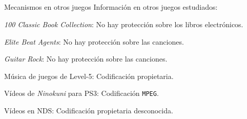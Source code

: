 \subsection{}
\begin{frame}{Mecanismos en otros juegos}
Información en otros juegos estudiados:

\begin{wideitemize}
    \item<+-> \textit{100 Classic Book Collection}: No hay protección sobre los libros electrónicos.

    \item<+-> \textit{Elite Beat Agents}: No hay protección sobre las canciones.

    \item<+-> \textit{Guitar Rock}: No hay protección sobre las canciones.

    \item<+-> Música de juegos de Level-5: Codificación propietaria.

    \item<+-> Vídeos de \textit{Ninokuni} para PS3: Codificación \texttt{MPEG}.

    \item<+-> Vídeos en NDS: Codificación propietaria desconocida.
\end{wideitemize}
\end{frame}
